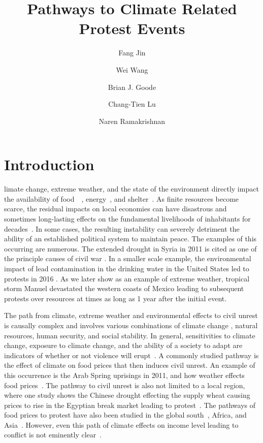 \documentclass[9pt,twocolumn,twoside]{pnas-new}
\title{Pathways to Climate Related Protest Events}
\author[a,1]{Fang Jin}
\author[a]{Wei Wang}
\author[a]{Brian J. Goode}
\author[a]{Chang-Tien Lu}
\author[a]{Naren Ramakrishnan}
\affil[a]{Discovery Analytics Center (Dept. of Computer Science), Virginia Tech - NCR, Arlington, VA 22203}
\begin{document}
\verticaladjustment{-2pt}

\maketitle
\thispagestyle{firststyle}
\section{Introduction}
limate change, extreme weather, and the state of the environment directly impact the availability of food~\cite{RW3}~\cite{akil2014effects}, energy~\cite{mitigation2011ipcc}, and shelter~\cite{warner2009search}.
As finite resources become scarce, the residual impacts on local economies can have disastrous and sometimes long-lasting effects on the fundamental livelihoods of inhabitants for decades~\cite{le2001political}.
In some cases, the resulting instability can severely detriment the ability of an established political system to maintain peace.
The examples of this occurring are numerous.
The extended drought in Syria in 2011 is cited as one of the principle causes of civil war \cite{gleick2014water,kelley2015climate}.
In a smaller scale example, the environmental impact of lead contamination in the drinking water in the United States led to protests in 2016 \cite{FlintMichiganArticle}.
As we later show as an example of extreme weather, tropical storm Manuel devastated the western coasts of Mexico leading to subsequent protests over resources at times as long as 1 year after the initial event.


The path from climate, extreme weather and environmental effects to civil unrest is causally complex \cite{hsiang2011civil,RW5} and involves various combinations of climate change \cite{burke2014climate}, natural resources, human security, and social stability.
In general, sensitivities to climate change, exposure to climate change, and the ability of a society to adapt are indicators of whether or not violence will erupt~\cite{RW9}.
A commonly studied pathway is the effect of climate on food prices that then induces civil unrest.
An example of this occurrence is the Arab Spring uprisings in 2011, and how weather effects food prices~\cite{RW2}.
The pathway to civil unrest is also not limited to a local region, where one study shows the Chinese drought effecting the supply wheat causing prices to rise in the Egyptian break market leading to protest~\cite{RW1}.
The pathways of food prices to protest have also been studied in the global south~\cite{RW4}, Africa, and Asia~\cite{wischnath2014climate,RW6}.
However, even this path of climate effects on income level leading to conflict is not eminently clear~\cite{RW10}.
\end{document}
